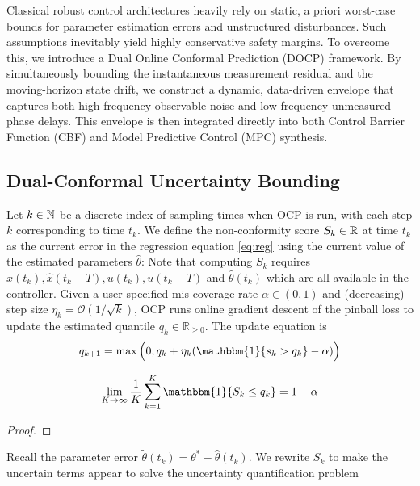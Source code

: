 \documentclass[letterpaper, 10 pt, conference]{ieeeconf}  %
\begin{document}
Classical robust control architectures heavily rely on static, a priori worst-case bounds for parameter estimation errors and unstructured disturbances. Such assumptions inevitably yield highly conservative safety margins. To overcome this, we introduce a Dual Online Conformal Prediction (DOCP) framework. By simultaneously bounding the instantaneous measurement residual and the moving-horizon state drift, we construct a dynamic, data-driven envelope that captures both high-frequency observable noise and low-frequency unmeasured phase delays. This envelope is then integrated directly into both Control Barrier Function (CBF) and Model Predictive Control (MPC) synthesis.

\subsection{Dual-Conformal Uncertainty Bounding}
Let $k \in \mathbb{N}$ be a discrete index of sampling times when OCP is run, with each step $k$ corresponding to time $t_k$.
We define the non-conformity score $S_k \in \mathbb{R}$ at time $t_k$ as the current error in the regression equation \eqref{eq:reg} using the current value of the estimated parameters $\hat \theta$:  Note that computing $S_k$ requires $\hat x(t_k), \hat x(t_k-T), u(t_k), u(t_k-T)$ and $\hat \theta(t_k)$ which are all available in the controller. Given a user-specified mis-coverage rate $\alpha \in (0,1)$ and (decreasing) step size $\eta_k = \mathcal{O}(1/\sqrt{k})$, OCP runs online gradient descent of the pinball loss to update the estimated quantile $q_k \in \mathbb{R}_{\ge 0}$. The update equation is
\begin{equation}
q_{k+1} = \max\Big(0, q_k + \eta_k (\mathbbm{1}\{s_k > q_k\} - \alpha)\Big)
\end{equation}

\begin{theorem}

\begin{equation}
\lim_{K \to \infty} \frac{1}{K} \sum_{k=1}^K \mathbbm{1}\{S_k \le q_k\} = 1 - \alpha
\end{equation}
\end{theorem}
\begin{proof}

\end{proof}

Recall the parameter error $\tilde \theta(t_k) = \theta^* - \hat 
\theta(t_k)$. We rewrite $S_k$ to make the uncertain terms appear to solve the uncertainty quantification problem 
\end{document}
